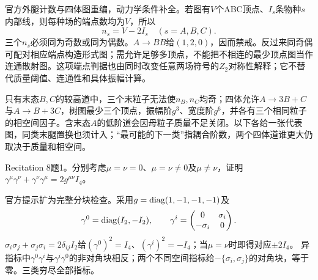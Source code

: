 \begin{solution}
官方外腿计数与四体图重编，动力学条件补全。若图有$V$个ABC顶点、$I_s$条物种$s$内部线，则每种场的端点数均为$V$，所以
\begin{equation}n_s=V-2I_s\quad(s=A,B,C).\end{equation}
三个$n_s$必须同为奇数或同为偶数。$A\to BB$给$(1,2,0)$，因而禁戒。反过来同奇偶可配对相应端点构造形式图；需允许足够多顶点，不能把不相连的最少顶点图当作连通散射图。这项端点判据也由同时改变任意两场符号的$Z_2$对称性解释；它不替代质量阈值、连通性和具体振幅计算。

只有末态$B,C$的较高道中，三个末粒子无法使$n_B,n_C$均奇；四体允许$A\to3B+C$与$A\to B+3C$，树图最少三个顶点，振幅阶$g^3$、宽度阶$g^6$，并各有三个相同粒子的相空间因子。含末态$A$的低阶道会因母粒子质量不足关闭。以下各给一张代表图，同类末腿置换也须计入；“最可能的下一类”指耦合阶数，两个四体道谁更大仍取决于质量和相空间。
\begin{center}\end{center}
\end{solution}
\begin{exercise}\label{ex:rec-8-1}
Recitation 8题1。分别考虑$\mu=\nu=0$、$\mu=\nu\ne0$及$\mu\ne\nu$，证明$\gamma^\mu\gamma^\nu+\gamma^\nu\gamma^\mu=2g^{\mu\nu}I_4$。
\end{exercise}
\begin{solution}
官方提示扩为完整分块检查。采用$g=\operatorname{diag}(1,-1,-1,-1)$及
\begin{equation}
\gamma^0=\operatorname{diag}(I_2,-I_2),\qquad
\gamma^i=\begin{pmatrix}0&\sigma_i\\-\sigma_i&0\end{pmatrix}.
\end{equation}
$\sigma_i\sigma_j+\sigma_j\sigma_i=2\delta_{ij}I_2$给$(\gamma^0)^2=I_4$、$(\gamma^i)^2=-I_4$；当$\mu=\nu$时即得对应$\pm2I_4$。
异指标中$\gamma^0\gamma^i$与$\gamma^i\gamma^0$的非对角块相反；两个不同空间指标给$-\{\sigma_i,\sigma_j\}$的对角块，等于零。三类穷尽全部指标。
\end{solution}
